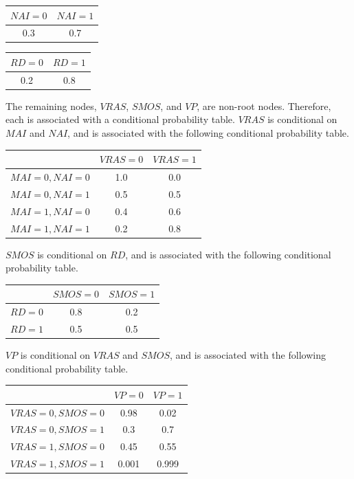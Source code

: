 \documentclass[solution, letterpaper]{cs121}
\begin{document}
\begin{empfile}
\begin{center}
\begin{tabular}{ c |c }
   $NAI = 0$ & $NAI = 1$ \\
   \hline
  0.3 & 0.7 \\
\end{tabular}
\end{center}

\begin{center}
\begin{tabular}{ c |c }
   $RD = 0$ & $RD = 1$ \\
   \hline
  0.2 & 0.8 \\
\end{tabular}
\end{center}

The remaining nodes, $VRAS$, $SMOS$, and $VP$, are non-root nodes. Therefore, each is associated with a conditional probability table. $VRAS$ is conditional on $MAI$ and $NAI$, and is associated with the following conditional probability table.
\begin{center}
\begin{tabular}{ c |c c }
   & $VRAS = 0$ & $VRAS = 1$ \\
   \hline
  $MAI = 0, NAI = 0 $ & 1.0 & 0.0 \\
  $MAI = 0, NAI = 1 $ & 0.5 & 0.5 \\
  $MAI = 1, NAI = 0 $ & 0.4 & 0.6 \\
  $MAI = 1, NAI = 1 $ & 0.2 & 0.8 \\
\end{tabular}
\end{center}

$SMOS$ is conditional on $RD$, and is associated with the following conditional probability table.
\begin{center}
\begin{tabular}{ c |c c }
   & $SMOS = 0$ & $SMOS = 1$ \\
   \hline
  $RD = 0$ & 0.8 & 0.2 \\
  $RD = 1$ & 0.5 & 0.5 \\
\end{tabular}
\end{center}

$VP$ is conditional on $VRAS$ and $SMOS$, and is associated with the following conditional probability table.
\begin{center}
\begin{tabular}{ c |c c }
   & $VP = 0$ & $VP = 1$ \\
   \hline
  $VRAS = 0, SMOS = 0 $ & 0.98 & 0.02 \\
  $VRAS = 0, SMOS = 1 $ & 0.3 & 0.7 \\
  $VRAS = 1, SMOS = 0 $ & 0.45 & 0.55 \\
  $VRAS = 1, SMOS = 1 $ & 0.001 & 0.999 \\
\end{tabular}
\end{center}


\end{empfile}
\end{document}
